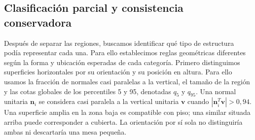 \documentclass[journal,onecolumn]{IEEEtran}
\begin{document}
\subsection{Clasificación parcial y consistencia conservadora}
Después de separar las regiones, buscamos identificar qué tipo de estructura podía representar cada una. Para ello establecimos reglas geométricas diferentes según la forma y ubicación esperadas de cada categoría. Primero distinguimos superficies horizontales por su orientación y su posición en altura. Para ello usamos la fracción de normales casi paralelas a la vertical, el tamaño de la región y las cotas globales de los percentiles 5 y 95, denotadas $q_5$ y $q_{95}$. Una normal unitaria $\mathbf{n}_i$ se considera casi paralela a la vertical unitaria $\mathbf{v}$ cuando $|\mathbf{n}_i^T\mathbf{v}|>0,94$. Una superficie amplia en la zona baja es compatible con piso; una similar situada arriba puede corresponder a cubierta. La orientación por sí sola no distinguiría ambas ni descartaría una mesa pequeña.
\end{document}
